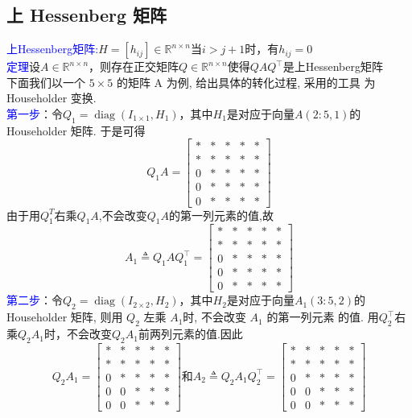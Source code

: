 \documentclass[12pt,a4paper]{article}
\begin{document}
\subsection{上 Hessenberg 矩阵}
 \noindent \textcolor{blue}{上Hessenberg矩阵:}$H=\left[h_{i j}\right] \in \mathbb{R}^{n \times n}$当$i>j+1$时，有$h_{i j}=0$\\
 \textcolor{blue}{定理}设$A \in \mathbb{R}^{n \times n}$，则存在正交矩阵$Q \in \mathbb{R}^{n \times n}$使得$Q A Q^{\top}$是上Hessenberg矩阵\\
 下面我们以一个 $5\times 5$ 的矩阵 A 为例, 给出具体的转化过程, 采用的工具 为 Householder 变换.\\
\textcolor{blue}{第一步}：令$Q_{1}=\operatorname{diag}\left(I_{1 \times 1}, H_{1}\right)$，其中$H_{1}$是对应于向量$A(2 : 5,1)$的 Householder 矩阵. 于是可得
$$
Q_{1} A=\left[\begin{array}{ccccc}
* &*& *& *&* \\ 
* &*& *& *&* \\ 
0 &*& *& *&*\\ 
0 &*& *& *&*\\ 
0 &*& *& *&*
\end{array}\right]
$$
由于用$Q_{1}^{T}$右乘$Q_{1} A$,不会改变$Q_{1} A$的第一列元素的值,故
$$
A_{1} \triangleq Q_{1} A Q_{1}^{\top}=\left[\begin{array}{ccccc}
* &*& *& *&* \\ 
* &*& *& *&* \\ 
0 &*& *& *&*\\ 
0 &*& *& *&*\\ 
0 &*& *& *&*
\end{array}\right]
$$
\textcolor{blue}{第二步}：令$Q_{2}=\operatorname{diag}\left(I_{2 \times 2}, H_{2}\right)$，其中$H_{2}$是对应于向量$A_{1}(3 : 5,2)$的 Householder 矩阵, 则用 $Q_{2}$ 左乘 $A_{1} $时, 不会改变 $A_{1}$ 的第一列元素 的值. 用$Q_{2}^{\top}$右乘$Q_{2} A_{1}$时，不会改变$Q_{2} A_{1}$前两列元素的值.因此
$$
Q_{2} A_{1}=\left[\begin{array}{ccccc}
* &*& *& *&* \\ 
* &*& *& *&* \\ 
0 &*& *& *&*\\ 
0 &0& *& *&*\\ 
0 &0& *& *&*
\end{array}\right]和
A_{2}\triangleq Q_{2} A_{1} Q_{2}^{\top}=\left[\begin{array}{ccccc}
* &*& *& *&* \\ 
* &*& *& *&* \\ 
0 &*& *& *&*\\ 
0 &0& *& *&*\\ 
0 &0& *& *&*
\end{array}\right]
$$
\end{document}
